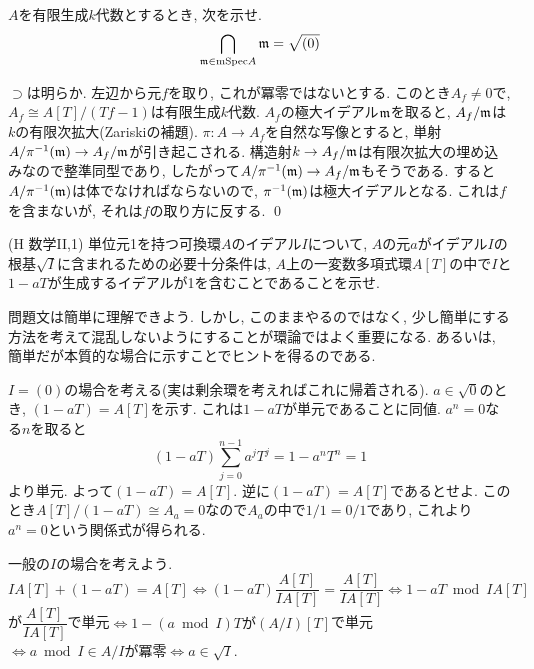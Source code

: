 \begin{egprob}
$A$を有限生成$k$代数とするとき, 次を示せ.
\[\bigcap_{\mathfrak{m}\in \mathrm{mSpec}A} \mathfrak{m} = \sqrt{(0)}\]
\end{egprob}
\begin{egans}
$\supset$は明らか. 左辺から元$f$を取り, これが冪零ではないとする. このとき$A_{f}\neq 0$で, $A_{f}\cong A[T]/(Tf-1)$は有限生成$k$代数. $A_{f}$の極大イデアル$\mathfrak{m}$を取ると, $A_{f}/\mathfrak{m}$は$k$の有限次拡大(Zariskiの補題). $\pi:A\to A_{f}$を自然な写像とすると, 単射$A/\pi^{-1}(\mathfrak{m}) \to A_{f}/\mathfrak{m}$が引き起こされる. 構造射$k\to A_{f}/\mathfrak{m}$は有限次拡大の埋め込みなので整準同型であり, したがって$A/\pi^{-1}(\mathfrak{m})\to A_{f}/\mathfrak{m}$もそうである. すると$A/\pi^{-1}(\mathfrak{m})$は体でなければならないので, $\pi^{-1}(\mathfrak{m})$は極大イデアルとなる. これは$f$を含まないが, それは$f$の取り方に反する. \qed
\end{egans}


\begin{egprob} (H 数学II,1)
単位元1を持つ可換環$A$のイデアル$I$について, $A$の元$a$がイデアル$I$の根基$\sqrt{I}$に含まれるための必要十分条件は, $A$上の一変数多項式環$A[T]$の中で$I$と$1-aT$が生成するイデアルが1を含むことであることを示せ.
\end{egprob}
\begin{point}
問題文は簡単に理解できよう. しかし, このままやるのではなく, 少し簡単にする方法を考えて混乱しないようにすることが環論ではよく重要になる. あるいは, 簡単だが本質的な場合に示すことでヒントを得るのである.
\end{point}

\begin{egans} $I=(0)$の場合を考える(実は剰余環を考えればこれに帰着される).
$a\in \sqrt{0}$のとき, $(1-aT) = A[T]$を示す. これは$1-aT$が単元であることに同値. $a^n = 0$なる$n$を取ると
\[(1-aT)\sum_{j=0}^{n-1}a^jT^j = 1- a^nT^n = 1\]
より単元. よって$(1-aT) = A[T]$. 逆に$(1-aT) = A[T]$であるとせよ. このとき$A[T]/(1-aT) \cong A_{a} = 0$なので$A_a$の中で$1/1 = 0/1$であり, これより$a^n = 0$という関係式が得られる. \par
一般の$I$の場合を考えよう. $IA[T]+(1-aT) = A[T]\iff (1-aT)\dfrac{A[T]}{IA[T]} = \dfrac{A[T]}{IA[T]} \iff 1-aT \bmod{IA[T]}$が$\dfrac{A[T]}{IA[T]} $で単元$\iff 1 - (a\bmod{I})T が(A/I)[T]$で単元$\iff a\bmod{I}\in A/Iが冪零 \iff a\in \sqrt{I}$.
\end{egans}



